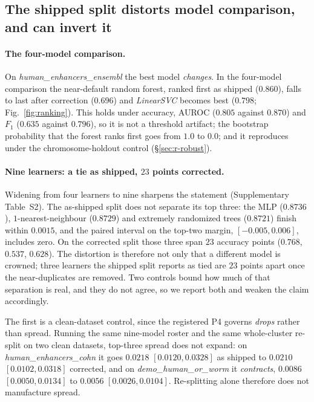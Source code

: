 \documentclass[webpdf,modern,large,namedate]{oup-authoring-template}%
\begin{document}
\subsection{The shipped split distorts model comparison, and can invert it}\label{sec:r-rank}
\paragraph{The four-model comparison.} On \textit{human\_enhancers\_ensembl} the best model \emph{changes}. In the four-model comparison the near-default random forest, ranked first as shipped ($0.860$), falls to last after correction ($0.696$) and \textit{LinearSVC} becomes best ($0.798$; Fig.~\ref{fig:ranking}). This holds under accuracy, AUROC ($0.805$ against $0.870$) and $F_1$ ($0.635$ against $0.796$), so it is not a threshold artifact; the bootstrap probability that the forest ranks first goes from $1.0$ to $0.0$; and it reproduces under the chromosome-holdout control (\S\ref{sec:r-robust}).

\paragraph{Nine learners: a tie as shipped, $23$ points corrected.} Widening from four learners to nine sharpens the statement (Supplementary Table~S2). The as-shipped split does not separate its top three: the MLP ($0.8736$), $1$-nearest-neighbour ($0.8729$) and extremely randomized trees ($0.8721$) finish within $0.0015$, and the paired interval on the top-two margin, $[-0.005,0.006]$, includes zero. On the corrected split those three span $23$ accuracy points ($0.768$, $0.537$, $0.628$). The distortion is therefore not only that a different model is crowned; three learners the shipped split reports as tied are $23$ points apart once the near-duplicates are removed. Two controls bound how much of that separation is real, and they do not agree, so we report both and weaken the claim accordingly.

The first is a clean-dataset control, since the registered P4 governs \emph{drops} rather than spread. Running the same nine-model roster and the same whole-cluster re-split on two clean datasets, top-three spread does not expand: on \textit{human\_enhancers\_cohn} it goes $0.0218$ $[0.0120,0.0328]$ as shipped to $0.0210$ $[0.0102,0.0318]$ corrected, and on \textit{demo\_human\_or\_worm} it \emph{contracts}, $0.0086$ $[0.0050,0.0134]$ to $0.0056$ $[0.0026,0.0104]$. Re-splitting alone therefore does not manufacture spread.
\end{document}
